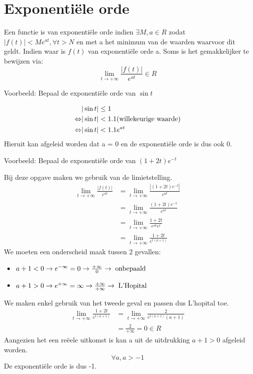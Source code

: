 \documentclass[12pt]{report}
\newcommand{\example}[2]{
    \hrulefill
    
    Voorbeeld: #1
    
    #2
    
    \hrulefill
}
\begin{document}
\section{Exponentiële orde}
Een functie is van exponentiële orde indien $\exists M, a \in R$ zodat $|f(t)| < Me^{at}, \forall t > N$ en met a het minimum van de waarden waarvoor dit geldt. Indien waar is $f(t)$ van exponentiële orde a.
Soms is het gemakkelijker te bewijzen via:
$$\lim_{t \to +\infty} \frac{|f(t)|}{e^{at}} \in R$$
\example{Bepaal de exponentiële orde van $\sin t$}{
\begin{equation*}
\begin{split}
                & |\sin t| \leq 1 \\
\Leftrightarrow & |\sin t| < 1.1 \hbox{(willekeurige waarde)} \\
\Leftrightarrow & |\sin t| < 1.1e^{at}
\end{split}
\end{equation*}
Hieruit kan afgeleid worden dat a = 0 en de exponentiële orde is dus ook 0.
}
\example{Bepaal de exponentiële orde van $(1 + 2t)e^{-t}$}{
Bij deze opgave maken we gebruik van de limietstelling.
\begin{equation*}
\begin{split}
\lim_{t \to +\infty} \frac{|f(t)|}{e^{at}} & = \lim_{t \to +\infty} \frac{|(1 + 2t)e^{-t}|}{e^{at}} \\
                                            & = \lim_{t \to +\infty} \frac{(1 + 2t)e^{-t}}{e^{at}} \\
                                            & = \lim_{t \to +\infty} \frac{1 + 2t}{e^{at}e^{t}} \\
                                            & = \lim_{t \to +\infty} \frac{1 + 2t}{e^{t(a +1)}} 
\end{split}
\end{equation*}
We moeten een onderscheid maak tussen 2 gevallen:
\begin{itemize}
\item $a + 1 < 0 \rightarrow e^{-\infty} = 0 \rightarrow \frac{+\infty}{0} \rightarrow \; \hbox{onbepaald}$
\item $a + 1 > 0 \rightarrow e^{+\infty} = \infty \rightarrow \frac{+\infty}{+\infty} \rightarrow \; \hbox{L'Hopital}$
\end{itemize}
We maken enkel gebruik van het tweede geval en passen dus L'hopital toe.
\begin{equation*}
\begin{split}
\lim_{t \to +\infty} \frac{1 + 2t}{e^{t(a +1)}} & = \lim_{t \to +\infty} \frac{2}{e^{t(a +1)}(a+1)} \\
                                                & = \frac{2}{+\infty} = 0 \in R
\end{split}
\end{equation*}
Aangezien het een reëele uitkomst is kan a uit de uitdrukking $a + 1 > 0$ afgeleid worden.
$$\forall a, a > -1$$
De exponentiële orde is dus -1.
}
\end{document}
